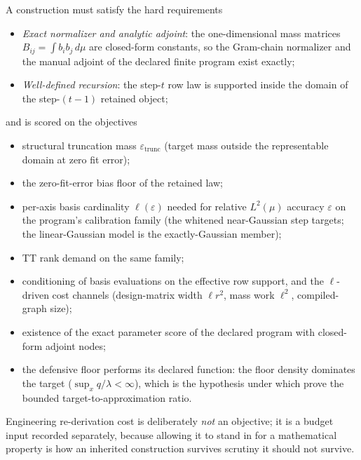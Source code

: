 \begin{definition}
\label{def:bf-hd-refdom-properties}
A construction must satisfy the hard requirements
\begin{itemize}[leftmargin=0.28in]
  \item[\textbf{R1}] \emph{Exact normalizer and analytic adjoint}: the
    one-dimensional mass matrices \(B_{ij}=\int b_i b_j\,d\mu\) are
    closed-form constants, so the Gram-chain normalizer and the manual
    adjoint of the declared finite program exist exactly;
  \item[\textbf{R2}] \emph{Well-defined recursion}: the step-\(t\) row
    law is supported inside the domain of the step-\((t-1)\) retained
    object;
\end{itemize}
and is scored on the objectives
\begin{itemize}[leftmargin=0.28in]
  \item[\textbf{O1}] structural truncation mass
    \(\varepsilon_{\mathrm{trunc}}\) (target mass outside the
    representable domain at zero fit error);
  \item[\textbf{O2}] the zero-fit-error bias floor of the retained law;
  \item[\textbf{O3}] per-axis basis cardinality \(\ell(\varepsilon)\)
    needed for relative \(L^2(\mu)\) accuracy \(\varepsilon\) on the
    program's calibration family (the whitened near-Gaussian step
    targets; the linear-Gaussian model is the exactly-Gaussian member);
  \item[\textbf{O4}] TT rank demand on the same family;
  \item[\textbf{O5}] conditioning of basis evaluations on the effective
    row support, and the \(\ell\)-driven cost channels (design-matrix
    width \(\ell r^2\), mass work \(\ell^2\), compiled-graph size);
  \item[\textbf{O6}] existence of the exact parameter score of the
    declared program with closed-form adjoint nodes;
  \item[\textbf{O7}] the defensive floor performs its declared function:
    the floor density dominates the target
    (\(\sup_x q/\lambda<\infty\)), which is the hypothesis under which
    \citet[eq.~(13) and Lemma~1]{zhao2024ttsequential} prove the bounded
    target-to-approximation ratio.
\end{itemize}
Engineering re-derivation cost is deliberately \emph{not} an objective;
it is a budget input recorded separately, because allowing it to stand in
for a mathematical property is how an inherited construction survives
scrutiny it should not survive.
\end{definition}

